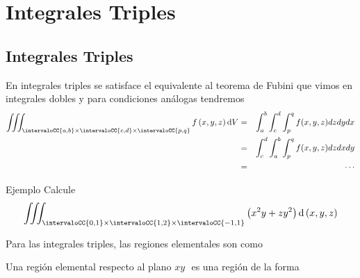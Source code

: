 \section{Integrales Triples}
\begin{frame}
\sectionpage
\end{frame}

\begin{frame}
\tableofcontents[currentsection]
\end{frame}

\subsection{Integrales Triples}
\begin{frame}
\subsectionpage
\end{frame}


\begin{frame}
  En integrales triples se satisface el equivalente al teorema de Fubini que vimos en integrales dobles y para condiciones análogas tendremos
  \begin{eqnarray*}
    \iiint_{\intervaloCC{a,b} \times \intervaloCC{c,d} \times \intervaloCC{p,q}}f\left( x,y,z\right) \mathrm{d}V
    &=&\int_a^b\int_c^d\int_p^q f(x,y,z) dz dy dx\\
    &=&\int_c^d\int_a^b\int_p^q f(x,y,z) dz dx dy\\
    &=&\cdots
  \end{eqnarray*}
\end{frame}

\begin{frame}{Ejemplo}
  Calcule
  $$\iiint_{\intervaloCC{0,1} \times \intervaloCC{1,2} \times \intervaloCC{-1,1}
  }\left( x^{2}y+zy^{2}\right) \mathrm{d}\left( x,y,z\right)$$
\end{frame}

\begin{frame}
  Para las integrales triples, las regiones elementales son como 
  \begin{defn}
  Una región elemental respecto al plano $xy\,$\ es una región de la forma
  \end{defn}
\end{frame}

